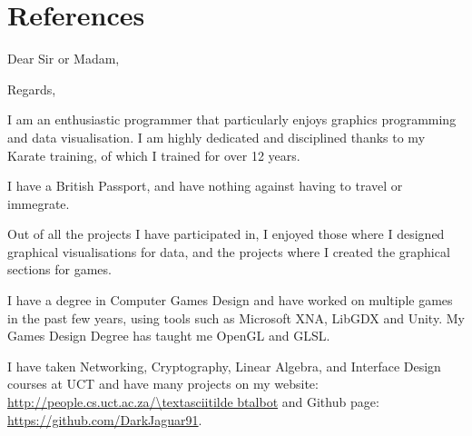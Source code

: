 \documentclass[11pt,a4paper,sans]{moderncv}
\begin{document}
\section{References}
\begin{cvcolumns}
\end{cvcolumns}

\clearpage

\opening{Dear Sir or Madam,}
\closing{Regards,}
\makelettertitle

I am an enthusiastic programmer that particularly enjoys graphics programming and data visualisation. I am highly dedicated and disciplined thanks to my Karate training, of which I trained for over 12 years.

I have a British Passport, and have nothing against having to travel or immegrate.

Out of all the projects I have participated in, I enjoyed those where I designed graphical visualisations for data, and the projects where I created the graphical sections for games.

I have a degree in Computer Games Design and have worked on multiple games in the past few years, using tools such as Microsoft XNA, LibGDX and Unity. My Games Design Degree has taught me OpenGL and GLSL.  

I have taken Networking, Cryptography, Linear Algebra, and Interface Design courses at UCT and have many projects on my website: \url{http://people.cs.uct.ac.za/\textasciitilde btalbot} and Github page: \url{https://github.com/DarkJaguar91}.


\makeletterclosing

\clearpage
\end{document}
